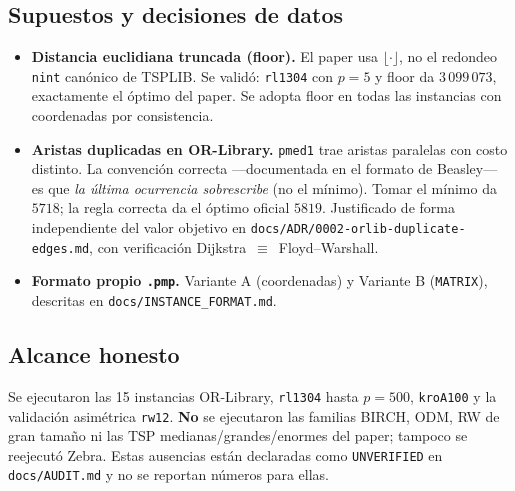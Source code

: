 \subsection{Supuestos y decisiones de datos}
\begin{itemize}[noitemsep]
  \item \textbf{Distancia euclidiana truncada (floor).} El paper usa $\lfloor\cdot\rfloor$, no el
        redondeo \texttt{nint} canónico de TSPLIB. Se validó: \texttt{rl1304} con $p=5$ y floor da
        $3\,099\,073$, exactamente el óptimo del paper. Se adopta floor en todas las instancias
        con coordenadas por consistencia.
  \item \textbf{Aristas duplicadas en OR-Library.} \texttt{pmed1} trae aristas paralelas con costo
        distinto. La convención correcta —documentada en el formato de Beasley— es que
        \emph{la última ocurrencia sobrescribe} (no el mínimo). Tomar el mínimo da $5718$; la
        regla correcta da el óptimo oficial $5819$. Justificado de forma independiente del valor
        objetivo en \texttt{docs/ADR/0002-orlib-duplicate-edges.md}, con verificación
        Dijkstra~$\equiv$~Floyd--Warshall.
  \item \textbf{Formato propio \texttt{.pmp}.} Variante A (coordenadas) y Variante B (\texttt{MATRIX}),
        descritas en \texttt{docs/INSTANCE\_FORMAT.md}.
\end{itemize}

\subsection{Alcance honesto}
Se ejecutaron las 15 instancias OR-Library, \texttt{rl1304} hasta $p=500$, \texttt{kroA100} y la
validación asimétrica \texttt{rw12}. \textbf{No} se ejecutaron las familias BIRCH, ODM, RW de gran
tamaño ni las TSP medianas/grandes/enormes del paper; tampoco se reejecutó Zebra. Estas
ausencias están declaradas como \texttt{UNVERIFIED} en \texttt{docs/AUDIT.md} y no se reportan
números para ellas.
